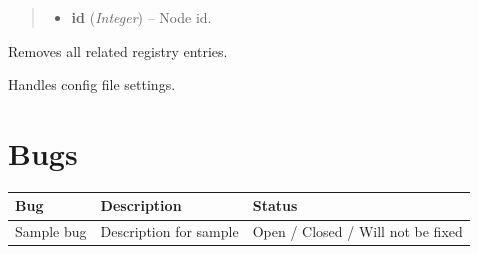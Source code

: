 \documentclass[letterpaper,10pt,english]{sphinxmanual}
\begin{document}
\begin{fulllineitems}
\begin{fulllineitems}
\begin{quote}
\begin{description}
\begin{itemize}
\item {} 
\textbf{id} (\emph{Integer}) -- Node id.

\end{itemize}

\end{description}\end{quote}

\end{fulllineitems}


\begin{fulllineitems}
\label{wos:wos.WORKER_THREAD.RemoveAllRegEntries}
Removes all related registry entries.

\end{fulllineitems}


\begin{fulllineitems}
\label{wos:wos.WORKER_THREAD.parseConfig}
Handles config file settings.

\end{fulllineitems}


\end{fulllineitems}



\chapter{Bugs}
\label{bugs::doc}\label{bugs:index-0}\label{bugs:bugs}
\begin{tabulary}{\linewidth}{|L|L|L|}
\hline
\textbf{
Bug
} & \textbf{
Description
} & \textbf{
Status
}\\\hline

Sample bug
 & 
Description for sample
 & 
Open / Closed / Will not be fixed
\\\hline
\end{tabulary}
\end{document}
